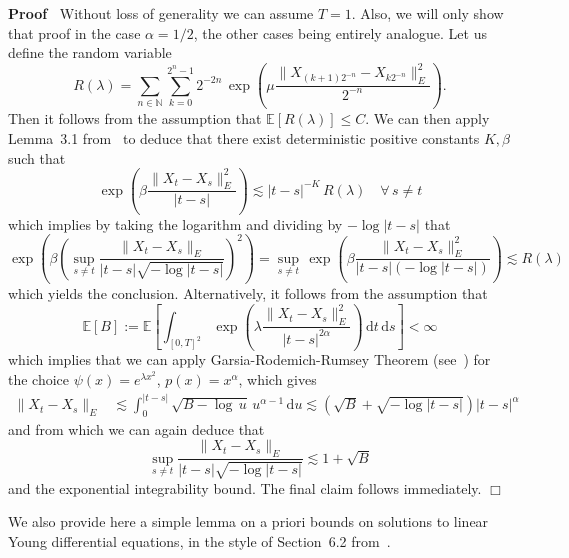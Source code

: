 \documentclass[10pt]{article}
\newcommand{\assign}{:=}
\newcommand{\mathd}{\mathrm{d}}
\newenvironment{proof}{\noindent\textbf{Proof\ }}{\hspace*{\fill}$\Box$\medskip}
\begin{document}
\begin{proof}
  Without loss of generality we can assume $T = 1$. Also, we will only show
  that proof in the case $\alpha = 1 / 2$, the other cases being entirely
  analogue. Let us define the random variable
  \[ R (\lambda) = \sum_{n \in \mathbb{N}} \sum_{k = 0}^{2^n - 1} 2^{- 2 n} \,
     \exp \left( \mu \frac{\| X_{(k + 1) 2^{- n}} - X_{k 2^{- n}} \|^2_E}{2^{-
     n}} \right) . \]
  Then it follows from the assumption that $\mathbb{E} [R (\lambda)] \leqslant
  C$. We can then apply Lemma~3.1 from~{\cite{catelliergubinelli}} to deduce
  that there exist deterministic positive constants $K, \beta$ such that
  \[ \exp \left( \beta \frac{\| X_t - X_s \|^2_E}{| t - s |} \right) \lesssim
     | t - s |^{- K} \, R (\lambda) \quad \forall \, s \neq t \]
  which implies by taking the logarithm and dividing by $- \log | t - s |$
  that
  \[ \exp \left( \beta \left( \sup_{s \neq t} \frac{\| X_t - X_s \|_E}{| t - s
     | \sqrt{- \log | t - s |}} \right)^2 \right) = \sup_{s \neq t} \, \exp
     \left( \beta \frac{\| X_t - X_s \|^2_E}{| t - s | (- \log | t - s |)}
     \right) \lesssim R (\lambda) \]
  which yields the conclusion. Alternatively, it follows from the assumption
  that
  \[ \mathbb{E} [B] \assign \mathbb{E} \left[ \int_{[0, T]^2} \exp \left(
     \lambda \frac{\| X_t - X_s \|^2_E}{| t - s |^{2 \alpha}} \right) \,
     \mathd t \, \mathd s \right] < \infty \]
  which implies that we can apply Garsia-Rodemich-Rumsey Theorem
  (see~{\cite{garsia}}) for the choice $\psi (x) = e^{\lambda x^2}$, $p (x) =
  x^{\alpha}$, which gives
%  
  \begin{align*}
    \| X_t - X_s \|_E & \lesssim \int_0^{| t - s |} \sqrt{B - \log \, u} \,
    u^{\alpha - 1} \, \mathd u \lesssim \left( \sqrt{B} + \sqrt{- \log | t - s
    |} \right) | t - s |^{\alpha}
  \end{align*}
%  
  and from which we can again deduce that
  \[ \sup_{s \neq t} \frac{\| X_t - X_s \|_E}{| t - s | \sqrt{- \log | t - s
     |}} \lesssim 1 + \sqrt{B} \]
  and the exponential integrability bound. The final claim follows
  immediately.
\end{proof}

We also provide here a simple lemma on a priori bounds on solutions to linear
Young differential equations, in the style of Section~6.2 from~{\cite{lejay}}.
\end{document}
